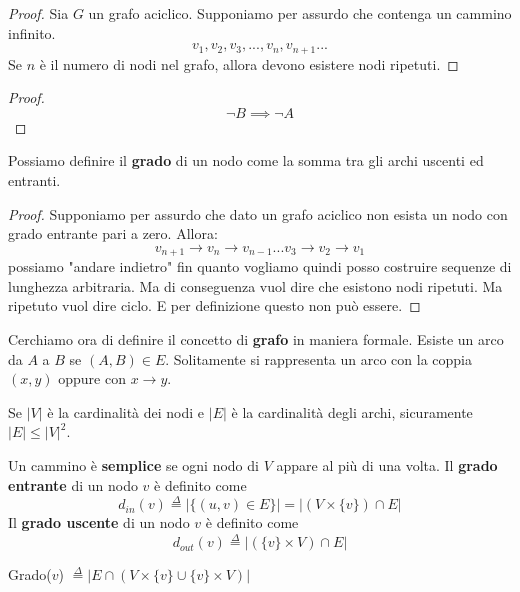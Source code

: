 \documentclass[a4paper]{article}
\begin{document}
\begin{proof}
  Sia $G$ un grafo aciclico. Supponiamo per assurdo che contenga un cammino infinito.
  \[v_1, v_2, v_3, ..., v_n, v_{n+1} ...\]
  Se $n$ è il numero di nodi nel grafo, allora devono esistere nodi ripetuti.
\end{proof}


\begin{proof}
  \[\neg B \implies \neg A\]
\end{proof}
Possiamo definire il \textbf{grado} di un nodo come la somma tra gli archi uscenti ed entranti.
 \begin{proof}
  Supponiamo per assurdo che dato
  un grafo aciclico non esista un nodo con grado entrante pari a zero. Allora:
  \[v_{n+1} \rightarrow v_n \rightarrow v_{n-1} ... v_3 \rightarrow v_2 \rightarrow v_1\]
  possiamo "andare indietro" fin quanto vogliamo quindi posso costruire sequenze di lunghezza arbitraria.
  Ma di conseguenza vuol dire che esistono nodi ripetuti. Ma ripetuto vuol dire ciclo. E per definizione questo
  non può essere.
 \end{proof} 
Cerchiamo ora di definire il concetto di \textbf{grafo} in maniera formale.
\noindent
Esiste un arco da $A$ a $B$ se $(A, B) \in E$. Solitamente si rappresenta un arco con la coppia $(x, y)$ oppure con $x \rightarrow y$.
\begin{lemma}
  Se $|V|$ è la cardinalità dei nodi e $|E|$ è la cardinalità degli archi, sicuramente $|E| \leq |V|^2$.
\end{lemma}
{
  Un cammino è \textbf{semplice} se ogni nodo di $V$ appare al più di una volta.
}
{
  Il \textbf{grado entrante} di un nodo $v$ è definito come
  \[d_{in}(v) \stackrel{\Delta}{=} |\{(u, v) \in E\}| = |(V \times \{v\})\cap E|\]
}
{
  Il \textbf{grado uscente} di un nodo $v$ è definito come
  \[d_{out}(v) \stackrel{\Delta}{=} |(\{v\} \times V) \cap E|\]
}
{
  \begin{center}
      Grado($v$) $\stackrel{\Delta}{=} |E \cap (V \times \{v\} \cup \{v\} \times V)|$
  \end{center}
}
\end{document}
